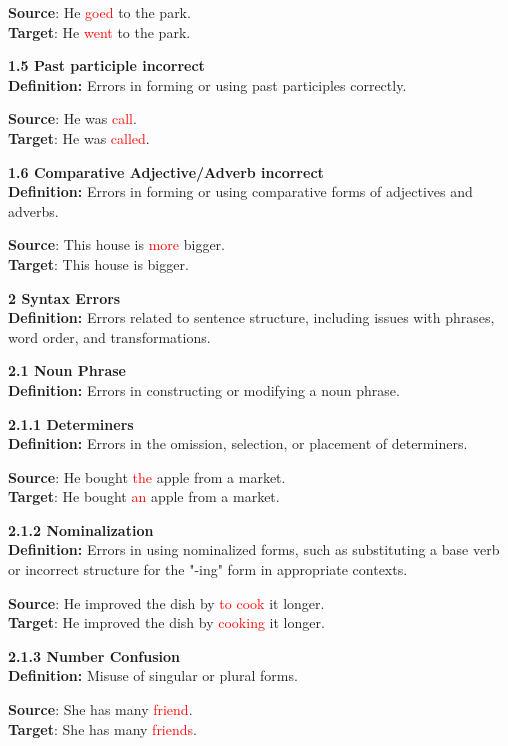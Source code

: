 \begin{tcolorbox}[breakable]
\textbf{Source}: He \textcolor{red}{goed} to the park. \\
\textbf{Target}: He \textcolor{red}{went} to the park.


\noindent \textbf{1.5 Past participle incorrect}\\
\textbf{Definition:} Errors in forming or using past participles correctly.


\textbf{Source}: He was \textcolor{red}{call}. \\
\textbf{Target}: He was \textcolor{red}{called}.


\noindent \textbf{1.6 Comparative Adjective/Adverb incorrect}\\
\textbf{Definition:} Errors in forming or using comparative forms of adjectives and adverbs.


\textbf{Source}: This house is \textcolor{red}{more} bigger. \\
\textbf{Target}: This house is bigger.


\noindent \textbf{2 Syntax Errors}\\
\textbf{Definition:} Errors related to sentence structure, including issues with phrases, word order, and transformations.

\noindent \textbf{2.1 Noun Phrase}\\
\textbf{Definition:} Errors in constructing or modifying a noun phrase.

\noindent \textbf{2.1.1 Determiners}\\
\textbf{Definition:} Errors in the omission, selection, or placement of determiners.


\textbf{Source}: He bought \textcolor{red}{the} apple from a market. \\
\textbf{Target}: He bought \textcolor{red}{an} apple from a market.


\noindent  \textbf{2.1.2 Nominalization}\\
\textbf{Definition:} Errors in using nominalized forms, such as substituting a base verb or incorrect structure for the "-ing" form in appropriate contexts.


\textbf{Source}: He improved the dish by \textcolor{red}{to cook} it longer. \\
\textbf{Target}: He improved the dish by \textcolor{red}{cooking} it longer.


\noindent \textbf{2.1.3 Number Confusion}\\
\textbf{Definition:} Misuse of singular or plural forms.


\textbf{Source}: She has many \textcolor{red}{friend}. \\
\textbf{Target}: She has many \textcolor{red}{friends}.



\end{tcolorbox}
